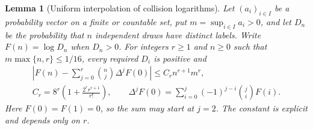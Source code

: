 \documentclass[11pt]{article}
\newtheorem{lemma}[theorem]{Lemma}
\theoremstyle{definition}
\begin{document}
\begin{lemma}[Uniform interpolation of collision logarithms]
\label{lem:all-order-collision-interpolation}
Let $(a_i)_{i\in I}$ be a probability vector on a finite or
countable set, put $m=\sup_{i\in I}a_i>0$, and let $D_n$
be the probability that $n$ independent draws have distinct labels.
Write $F(n)=\log D_n$ when $D_n>0$.
For integers $r\ge1$ and $n\ge0$ such that
$m\max\{n,r\}\le1/16$, every required $D_i$ is positive and
\begin{equation}
 \begin{gathered}
 \left|F(n)-\sum_{j=0}^r{n\choose j}\Delta^jF(0)\right|
       \le C_r n^{r+1}m^r,\\
 C_r=8^r\left(1+\frac{2^r r^{r+1}}{r!}\right),\qquad
 \Delta^jF(0)=\sum_{i=0}^j(-1)^{j-i}{j\choose i}F(i).
 \end{gathered}
 \label{eq:all-order-collision-interpolation}
\end{equation}
Here $F(0)=F(1)=0$, so the sum may start at $j=2$.
The constant is explicit and depends only on $r$.
\end{lemma}
\end{document}
